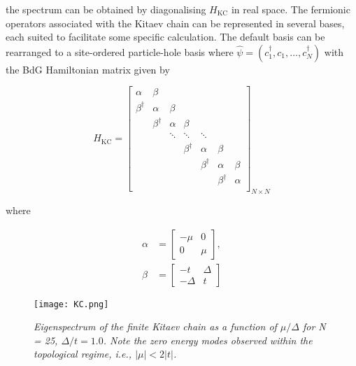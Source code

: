 the spectrum can be obtained by diagonalising $H_{\text{KC}}$ in real space. The fermionic operators associated with the Kitaev chain can be represented in several bases, each suited to facilitate some specific calculation. The default basis can be rearranged to a site-ordered particle-hole basis where $\hat{\psi} = (c_{1}^{\dagger},c_{1},\dots,c_{N}^{\dagger})$ with the BdG Hamiltonian matrix given by 

\begin{equation}
    H_{\text{KC}} = 
    \begin{bmatrix}
        \alpha & \beta &  &  &  &  &  \\
        \beta^{\dagger} & \alpha & \beta &  &  &  &  \\
        & \beta^{\dagger} & \alpha & \beta &  &  &  \\
        &  & \ddots & \ddots & \ddots &  &  \\
        &  &  & \beta^{\dagger} & \alpha & \beta &  \\
        &  &  &  & \beta^{\dagger} & \alpha & \beta \\
        &  &  &  &  & \beta^{\dagger} & \alpha \\        
    \end{bmatrix}_{N \times N}   
\end{equation}

where 

\begin{equation}
    \begin{aligned}
        \alpha &= 
        \begin{bmatrix}
            -\mu & 0 \\
            0 & \mu            
        \end{bmatrix}, \\
        \beta &= 
        \begin{bmatrix}
            -t & \Delta \\
            -\Delta & t             
        \end{bmatrix}        
    \end{aligned}    
\end{equation}

\clearpage

\vspace*{1cm}

\begin{figure}[h]
\centering
\texttt{[image: KC.png]}
\caption{\textit{Eigenspectrum of the finite Kitaev chain as a function of $\mu/\Delta$ for N = 25, $\Delta/t = 1.0$. Note the zero energy modes observed within the topological regime, i.e., $|\mu| < 2|t|$.}}
\end{figure}

